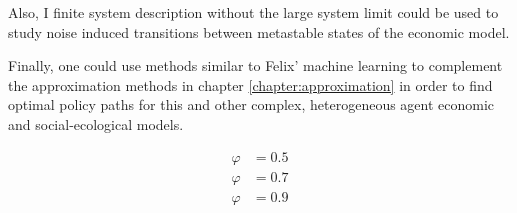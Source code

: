 Also, I finite system description without the large system limit could be used to study noise induced transitions between metastable states of the economic model.


Finally, one could use methods similar to Felix' machine learning to complement the approximation methods in chapter \ref{chapter:approximation} in order to find optimal policy paths for this and other complex, heterogeneous agent economic and social-ecological models.

\begin{align}
  \varphi &= 0.5 \\
  \varphi &= 0.7 \\
  \varphi &= 0.9 \\
\end{align}
